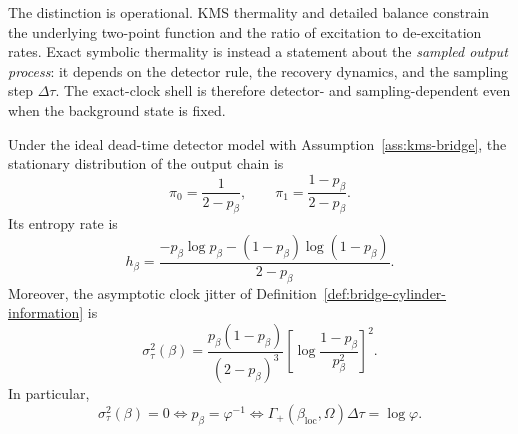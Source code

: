 \begin{remark}\label{rem:exact-symbolic-vs-kms}
The distinction is operational. KMS thermality and detailed balance constrain the underlying two-point function and the ratio of excitation to de-excitation rates. Exact symbolic thermality is instead a statement about the \emph{sampled output process}: it depends on the detector rule, the recovery dynamics, and the sampling step $\Delta\tau$. The exact-clock shell is therefore detector- and sampling-dependent even when the background state is fixed.
\end{remark}

\begin{theorem}\label{thm:kms-clock}
Under the ideal dead-time detector model with Assumption~\ref{ass:kms-bridge}, the stationary distribution of the output chain is
\begin{equation}\label{eq:bridge-stationary-law}
\pi_0=\frac{1}{2-p_\beta},
\qquad
\pi_1=\frac{1-p_\beta}{2-p_\beta}.
\end{equation}
Its entropy rate is
\begin{equation}\label{eq:bridge-entropy-rate}
h_\beta
=
\frac{-p_\beta\log p_\beta-(1-p_\beta)\log(1-p_\beta)}{2-p_\beta}.
\end{equation}
Moreover, the asymptotic clock jitter of Definition~\ref{def:bridge-cylinder-information} is
\begin{equation}\label{eq:bridge-jitter}
\sigma_\tau^2(\beta)
=
\frac{p_\beta(1-p_\beta)}{(2-p_\beta)^3}
\left[
\log\frac{1-p_\beta}{p_\beta^2}
\right]^2.
\end{equation}
In particular,
\begin{equation}\label{eq:bridge-parry-point}
\sigma_\tau^2(\beta)=0
\iff
p_\beta=\varphi^{-1}
\iff
\Gamma_+(\beta_{\mathrm{loc}},\Omega)\Delta\tau=\log\varphi.
\end{equation}
\end{theorem}


